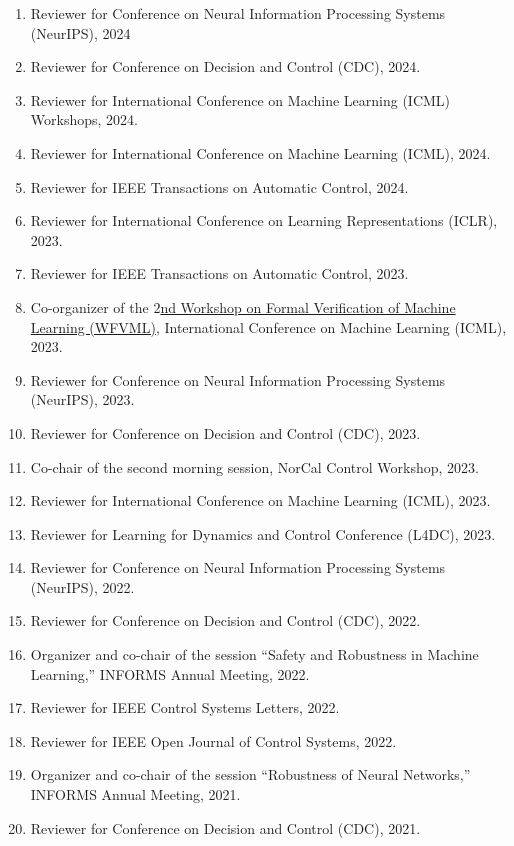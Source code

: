 \documentclass[11pt]{article}
\begin{document}
	\begin{enumerate}[label={\arabic*.}]
		\item Reviewer for Conference on Neural Information Processing Systems (NeurIPS), 2024
		\item Reviewer for Conference on Decision and Control (CDC), 2024.
		\item Reviewer for International Conference on Machine Learning (ICML) Workshops, 2024.
		\item Reviewer for International Conference on Machine Learning (ICML), 2024.
		\item Reviewer for IEEE Transactions on Automatic Control, 2024.
		\item Reviewer for International Conference on Learning Representations (ICLR), 2023.
		\item Reviewer for IEEE Transactions on Automatic Control, 2023.
		\item Co-organizer of the \href{https://www.ml-verification.com/2023}{$2$nd Workshop on Formal Verification of Machine Learning (WFVML)}, International Conference on Machine Learning (ICML), 2023.
		\item Reviewer for Conference on Neural Information Processing Systems (NeurIPS), 2023.
		\item Reviewer for Conference on Decision and Control (CDC), 2023.
		\item Co-chair of the second morning session, NorCal Control Workshop, 2023.
		\item Reviewer for International Conference on Machine Learning (ICML), 2023.
		\item Reviewer for Learning for Dynamics and Control Conference (L4DC), 2023.
		\item Reviewer for Conference on Neural Information Processing Systems (NeurIPS), 2022.
		\item Reviewer for Conference on Decision and Control (CDC), 2022.
		\item Organizer and co-chair of the session ``Safety and Robustness in Machine Learning,'' INFORMS Annual Meeting, 2022.
		\item Reviewer for IEEE Control Systems Letters, 2022.
		\item Reviewer for IEEE Open Journal of Control Systems, 2022.
		\item Organizer and co-chair of the session ``Robustness of Neural Networks,'' INFORMS Annual Meeting, 2021.
		\item Reviewer for Conference on Decision and Control (CDC), 2021.

\end{enumerate}
\end{document}
